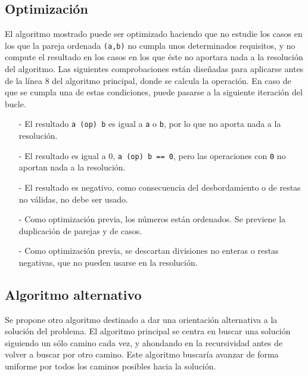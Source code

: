 \documentclass[a4paper,10pt]{scrartcl}
\def\C++#1{\texttt{#1}}
\begin{document}
   \subsection{Optimización}
   El algoritmo mostrado puede ser optimizado haciendo que no estudie los casos en los que la pareja ordenada \C++{(a,b)} no cumpla unos
   determinados requisitos, y no compute el resultado en los casos en los que éste no aportara nada a la resolución del algoritmo. Las
   siguientes comprobaciones están diseñadas para aplicarse antes de la línea 8 del algoritmo principal, donde se calcula la operación. 
   En caso de que se cumpla una de estas condiciones, puede pasarse a la siguiente iteración del bucle.\\
   \begin{itemize}
    \item [-] El resultado \C++{a (op) b} es igual a \C++{a} o \C++{b}, por lo que no aporta nada a la resolución.
    \item [-] El resultado es igual a 0, \C++{a (op) b == 0}, pero las operaciones con \C++{0} no aportan nada a la resolución.
    \item [-] El resultado es negativo, como consecuencia del desbordamiento o de restas no válidas, no debe ser usado.
    \item [-] Como optimización previa, los números están ordenados. Se previene la duplicación de parejas y de casos.
    \item [-] Como optimización previa, se descartan divisiones no enteras o restas negativas, que no pueden usarse en la resolución.
   \end{itemize}

   
   \subsection{Algoritmo alternativo}
   Se propone otro algoritmo destinado a dar una orientación alternativa a la solución del problema. El algoritmo principal se centra
   en buscar una solución siguiendo un sólo camino cada vez, y ahondando en la recursividad antes de volver a buscar por otro camino.
   Este algoritmo buscaría avanzar de forma uniforme por todos los caminos posibles hacia la solución.
   
\end{document}
